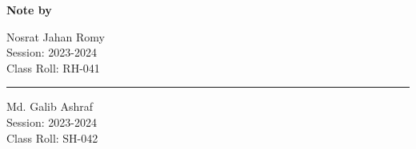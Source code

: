 \documentclass[a4aper,12pt]{report}
\begin{document}
    \begin{center}
        {\Large\textbf{ Note by}} \\
        \begin{minipage}{0.3\linewidth}
            \begin{flushright}
                {\large
                Nosrat Jahan Romy \\
        Session: 2023-2024 \\ 
        Class Roll: RH-041}
            \end{flushright}
        \end{minipage}
        \begin{minipage}{0.05\linewidth}
            \begin{center}
                \rule{1pt}{2.2cm}
            \end{center}
            
        \end{minipage}
        \begin{minipage}{0.3\linewidth}
            {\large Md. Galib Ashraf \\
        Session: 2023-2024 \\ 
        Class Roll: SH-042}
        \end{minipage}
    \begin{Large}
         
        
    \end{Large}    
    \end{center}
    \thispagestyle{empty}
    \newpage 
\end{document}
